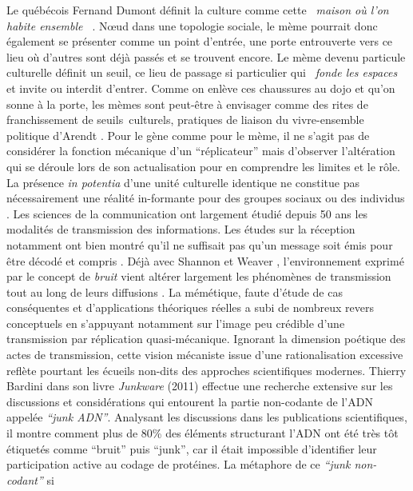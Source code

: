  Le qu\'eb\'ecois Fernand Dumont d\'efinit la culture comme cette \textit{{\guillemotleft}~maison o\`u l{\textquoteright}on habite ensemble~{\guillemotright} }\citep{Dumont1993}. N{\oe}ud dans une topologie sociale, le m\`eme pourrait donc \'egalement se pr\'esenter comme un point d{\textquoteright}entr\'ee, une porte entrouverte vers ce lieu o\`u d{\textquoteright}autres sont d\'ej\`a pass\'es et se trouvent encore. Le m\`eme devenu particule culturelle d\'efinit un seuil, ce lieu de passage si particulier qui \textit{{\guillemotleft}~fonde les espaces~{\guillemotright}} \citep{Bonnin2000} et invite ou interdit d{\textquoteright}entrer. Comme on enl\`eve ces chaussures au dojo et qu{\textquoteright}on sonne \`a la porte, les m\`emes sont peut-\^etre \`a envisager comme des rites de franchissement de seuils~culturels, pratiques de liaison du vivre-ensemble politique d{\textquoteright}Arendt \citep{Arendt2001} . Pour le g\`ene comme pour le m\`eme, il ne s{\textquoteright}agit pas de consid\'erer la fonction m\'ecanique d{\textquoteright}un {\textquotedblleft}r\'eplicateur{\textquotedblright} mais d{\textquoteright}observer l{\textquoteright}alt\'eration qui se d\'eroule lors de son actualisation pour en comprendre les limites et le r\^ole. La pr\'esence \textit{in potentia }d{\textquoteright}une unit\'e culturelle identique ne constitue pas n\'ecessairement une r\'ealit\'e in-formante pour des groupes sociaux ou des individus \citep{Lissack2004}. Les sciences de la communication ont largement \'etudi\'e depuis 50 ans les modalit\'es de transmission des informations. Les \'etudes sur la r\'eception notamment ont bien montr\'e qu{\textquoteright}il ne suffisait pas qu{\textquoteright}un message soit \'emis pour \^etre d\'ecod\'e et compris \citep{Liebes1990}. D\'ej\`a avec Shannon et Weaver \citep{Jakobson1960}, l{\textquoteright}environnement exprim\'e par le concept de\textit{ bruit }vient alt\'erer largement les ph\'enom\`enes de transmission tout au long de leurs diffusions \citep{Attali1978}. La m\'em\'etique, faute d{\textquoteright}\'etude de cas cons\'equentes et d{\textquoteright}applications th\'eoriques r\'eelles \citep{Jouxtel2014} a subi de nombreux revers conceptuels en s{\textquoteright}appuyant notamment sur l{\textquoteright}image peu cr\'edible d{\textquoteright}une transmission par r\'eplication quasi-m\'ecanique. Ignorant la dimension po\'etique des actes de transmission, cette vision m\'ecaniste issue d{\textquoteright}une rationalisation excessive refl\`ete pourtant les \'ecueils non-dits des approches scientifiques modernes. Thierry Bardini dans son livre \textit{Junkware }(2011) effectue une recherche extensive sur les discussions et consid\'erations qui entourent la partie non-codante de l{\textquoteright}ADN appel\'ee \textit{{\textquotedblleft}junk ADN{\textquotedblright}}. Analysant les discussions dans les publications scientifiques, il montre comment plus de 80\% des \'el\'ements structurant l{\textquoteright}ADN ont \'et\'e tr\`es t\^ot \'etiquet\'es comme {\textquotedblleft}bruit{\textquotedblright} puis {\textquotedblleft}junk{\textquotedblright}, car il \'etait impossible d{\textquoteright}identifier leur participation active au codage de prot\'eines. La m\'etaphore de ce \textit{{\textquotedblleft}junk non-codant{\textquotedblright} }si 